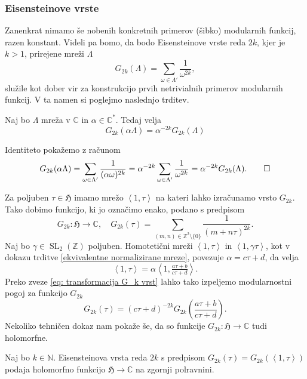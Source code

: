 \documentclass[mat1]{fmfdelo}
\numberwithin{equation}{section}
\newcommand{\N}{\mathbb N}
\newcommand{\Z}{\mathbb Z}
\newcommand{\C}{\mathbb C}
\newcommand{\HH}{\mathfrak{H}}
\newcommand{\CM}{\mathbb C ^*}
\newcommand{\om}{\omega}
\newcommand{\SL}{\operatorname{SL}_2(\Z)}
\newcommand{\lattice}[2]{\left\langle #1, #2 \right\rangle}
\theoremstyle{definition}
\begin{document}
\subsubsection*{Eisensteinove vrste}
Zanenkrat nimamo še nobenih konkretnih primerov (šibko) modularnih funkcij, razen konstant. Videli pa bomo, da bodo Eisensteinove vrste reda $2k$, kjer je $k > 1$, prirejene mreži $\Lambda$
\[
    G_{2k}(\Lambda) = \sum_{\om\in\Lambda'}\frac{1}{\om^{2k}},
\]
služile kot dober vir za konstrukcijo prvih netrivialnih primerov modularnih funkcij. V ta namen si poglejmo naslednjo trditev.

\begin{trditev}
    Naj bo $\Lambda$ mreža v $\C$ in $\alpha \in \CM$. Tedaj velja
    \begin{equation}
    \label{eq: transformacija G_k vrst}
        G_{2k}(\alpha\Lambda) = \alpha^{-2k}G_{2k}(\Lambda)
    \end{equation}
\end{trditev}

\begin{dokaz}
    Identiteto pokažemo z računom
    \[
        G_{2k}(\alpha\Lambda) = \sum_{\om\in\Lambda'}\frac{1}{(\alpha\om)^{2k}} = \alpha^{-2k}\sum_{\om\in\Lambda'}\frac{1}{\om^{2k}} = \alpha^{-2k}G_{2k}(\Lambda). \qedhere
    \]
\end{dokaz}
Za poljuben $\tau \in \HH$ imamo mrežo $\lattice{1}{\tau}$ na kateri lahko izračunamo vrsto $G_{2k}$. Tako dobimo funkcijo, ki jo označimo enako, podano s predpisom
\[
    G_{2k} : \HH \to \C, \quad G_{2k}(\tau) = \sum_{(m,n) \in \Z^2\setminus\{0\}} \frac{1}{(m + n\tau)^{2k}}.
\]
Naj bo $\gamma \in \SL$ poljuben. Homotetični mreži $\lattice{1}{\tau}$ in $\lattice{1}{\gamma\tau}$, kot v dokazu trditve \ref{ekvivalentne normalizirane mreze}, povezuje $\alpha = c\tau + d$, da velja
\[
    \lattice{1}{\tau} = \alpha\lattice{1}{\tfrac{a\tau + b}{c\tau + d}}.
\]
Preko zveze \eqref{eq: transformacija G_k vrst} lahko tako izpeljemo modularnostni pogoj za funkcijo $G_{2k}$
\[
    G_{2k}(\tau) = (c\tau + d)^{-2k}G_{2k}\left(\frac{a\tau + b}{c\tau + d}\right).
\]
Nekoliko tehničen dokaz
nam pokaže še, da so funkcije $G_{2k} : \HH \to \C$ tudi holomorfne.

\begin{trditev}
    \label{holomorfnost Gk}
    Naj bo $k \in \N$. Eisensteinova vrsta reda $2k$ s predpisom $G_{2k}(\tau) = G_{2k}(\lattice{1}{\tau})$ podaja holomorfno funkcijo $\HH \to \C$ na zgornji polravnini.
\end{trditev}
\end{document}
